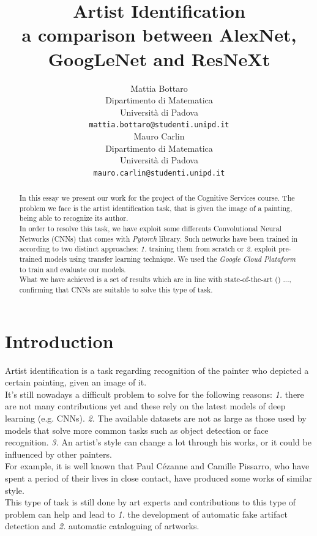 \documentclass{article}
\title{Artist Identification	\\  a comparison between AlexNet, GoogLeNet and ResNeXt}
\author{
  Mattia Bottaro \\
  Dipartimento  di Matematica\\
  Università di Padova \\
  \texttt{mattia.bottaro@studenti.unipd.it} \\
   \And
  Mauro Carlin \\
Dipartimento  di Matematica\\
Università di Padova \\
\texttt{mauro.carlin@studenti.unipd.it} \\
}
\begin{document}
\maketitle

\begin{abstract}
	In this essay we present our work for the project of the Cognitive Services course.
	The problem we face is the artist identification task, that is given the image of a painting, being able to recognize its author.\\
	In order to resolve this task, we have exploit some differents Convolutional Neural Networks (CNNs) that comes with \textit{Pytorch} library. Such networks have been trained in according to two distinct approaches: \textit{1.} training them from scratch or  \textit{2.} exploit pre-trained models using transfer learning technique. We used the \textit{Google Cloud Plataform} to train and evaluate our models.\\
	What we have achieved is a set of results which are in line with  state-of-the-art (\cite{ArtistIdCNN406}) ..., confirming that CNNs are suitable to solve this type of task.
\end{abstract}




\section{Introduction}
Artist identification is a task regarding recognition of the painter who depicted a certain painting, given an image of it.\\
It's still nowadays a difficult problem to solve for the following reasons: \textit{1.} there are not many contributions yet and these rely on the latest models of deep learning (e.g. CNNs). \textit{2.} The available datasets are not as large as those used by models that solve more common tasks such as object detection or face recognition. \textit{3.} An artist's style can change a lot through his works, or it could be influenced by other painters. \\For example, it is well known that Paul Cézanne and Camille Pissarro, who have spent a period of their lives in close contact, have produced some works of similar style.\\
This type of task is still done by art experts and contributions to this type of problem can help and lead to \textit{1.} the development of automatic fake artifact detection and \textit{2.} automatic cataloguing of artworks.\\
\end{document}
